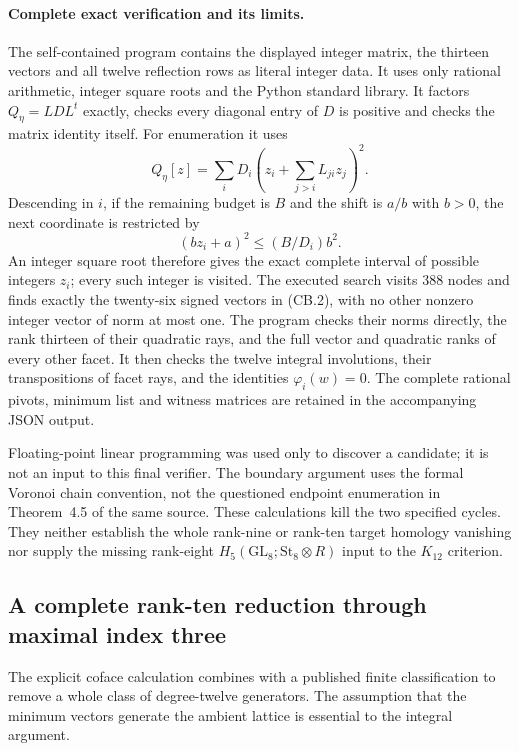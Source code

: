 \documentclass[11pt,a4paper]{article}
\theoremstyle{definition}
\begin{document}
\paragraph{Complete exact verification and its limits.}
The self-contained program
 contains the displayed
integer matrix, the thirteen vectors and all twelve reflection
rows as literal integer data. It uses only rational arithmetic,
integer square roots and the Python standard library.
It factors $Q_\eta=L D L^t$ exactly, checks every diagonal entry
of $D$ is positive and checks the matrix identity itself.
For enumeration it uses
\[
 Q_\eta[z]=\sum_i D_i
       \left(z_i+\sum_{j>i}L_{ji}z_j\right)^2.
\]
Descending in $i$, if the remaining budget is $B$ and the shift
is $a/b$ with $b>0$, the next coordinate is restricted by
\[
 (b z_i+a)^2\le (B/D_i)b^2.
\]
An integer square root therefore gives the exact complete
interval of possible integers $z_i$; every such integer is
visited. The executed search visits $388$ nodes and finds
exactly the twenty-six signed vectors in (CB.2), with no
other nonzero integer vector of norm at most one.
The program checks their norms directly, the rank thirteen of
their quadratic rays, and the full vector and quadratic ranks
of every other facet. It then checks the twelve integral
involutions, their transpositions of facet rays, and the
identities $\varphi_i(w)=0$. The complete rational pivots,
minimum list and witness matrices are retained in the
accompanying JSON output.

Floating-point linear programming was used only to discover a
candidate; it is not an input to this final verifier. The boundary
argument uses the formal Voronoi chain convention, not the
questioned endpoint enumeration in Theorem~4.5 of the same
source. These calculations kill the two specified cycles.
They neither establish the whole rank-nine or rank-ten target
homology vanishing nor supply the missing rank-eight
$H_5(\mathrm{GL}_8;\mathrm{St}_8\otimes R)$ input to the
$K_{12}$ criterion.

\subsection{A complete rank-ten reduction through maximal index three}
\label{subsec:k12-trimodular-classification}

The explicit coface calculation combines with a published finite
classification to remove a whole class of degree-twelve generators.
The assumption that the minimum vectors generate the ambient lattice
is essential to the integral argument.
\end{document}
